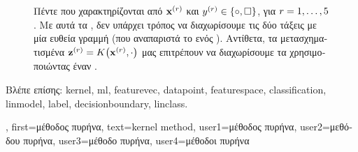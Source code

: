 {{\begin{figure}[H]
\begin{center}
		\end{center}
		{
		\caption{\foreignlanguage{greek}{Πέντε}  \foreignlanguage{greek}{που χαρακτηρίζονται από} 
		 ${\bf x}^{(r)}$ \foreignlanguage{greek}{και} 
		 $y^{(r)} \in \{ \circ, \square \}$, \foreignlanguage{greek}{για $r=1, \ldots, 5$. 
		Με αυτά τα} , \foreignlanguage{greek}{δεν υπάρχει τρόπος να διαχωρίσουμε τις δύο τάξεις  
		με μία ευθεία γραμμή (που αναπαριστά το}  \foreignlanguage{greek}{ενός} ). 
		\foreignlanguage{greek}{Αντίθετα, τα μετασχηματισμένα}  ${\bf z}^{(r)} = K\big({\bf x}^{(r)},\cdot\big)$ 
		\foreignlanguage{greek}{μας επιτρέπουν να διαχωρίσουμε τα}  \foreignlanguage{greek}{χρησιμοποιώντας 
		έναν} .  \label{fig_linsep_kernel_dict}} }
		\end{figure}
		\foreignlanguage{greek}{Βλέπε επίσης:} \gls{kernel}, \gls{ml}, \gls{featurevec}, \gls{datapoint}, \gls{featurespace}, \gls{classification}, \gls{linmodel}, 
		\gls{label}, \gls{decisionboundary}, \gls{linclass}.},
	first={\foreignlanguage{greek}{μέθοδος πυρήνα}},
	text={kernel method},
	user1={\foreignlanguage{greek}{μέθοδος πυρήνα}}, %
	user2={\foreignlanguage{greek}{μεθόδου πυρήνα}}, %
	user3={\foreignlanguage{greek}{μέθοδο πυρήνα}}, %
	user4={\foreignlanguage{greek}{μέθοδοι πυρήνα}} %
}

